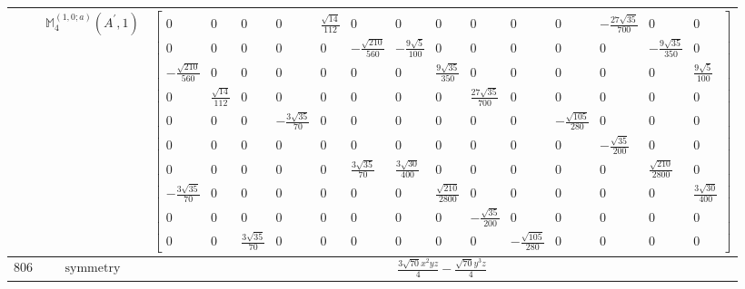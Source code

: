 \documentclass[fleqn,8pt,landscape]{jsarticle}
\begin{document}
\begin{longtable}{ccc}
$  $ & $ \mathbb{M}_{4}^{(1,0;a)}(A^{\prime},1) $ & $ \begin{bmatrix} 0 & 0 & 0 & 0 & \frac{\sqrt{14}}{112} & 0 & 0 & 0 & 0 & 0 & 0 & - \frac{27 \sqrt{35}}{700} & 0 & 0 \\ 0 & 0 & 0 & 0 & 0 & - \frac{\sqrt{210}}{560} & - \frac{9 \sqrt{5}}{100} & 0 & 0 & 0 & 0 & 0 & - \frac{9 \sqrt{35}}{350} & 0 \\ - \frac{\sqrt{210}}{560} & 0 & 0 & 0 & 0 & 0 & 0 & \frac{9 \sqrt{35}}{350} & 0 & 0 & 0 & 0 & 0 & \frac{9 \sqrt{5}}{100} \\ 0 & \frac{\sqrt{14}}{112} & 0 & 0 & 0 & 0 & 0 & 0 & \frac{27 \sqrt{35}}{700} & 0 & 0 & 0 & 0 & 0 \\ 0 & 0 & 0 & - \frac{3 \sqrt{35}}{70} & 0 & 0 & 0 & 0 & 0 & 0 & - \frac{\sqrt{105}}{280} & 0 & 0 & 0 \\ 0 & 0 & 0 & 0 & 0 & 0 & 0 & 0 & 0 & 0 & 0 & - \frac{\sqrt{35}}{200} & 0 & 0 \\ 0 & 0 & 0 & 0 & 0 & \frac{3 \sqrt{35}}{70} & \frac{3 \sqrt{30}}{400} & 0 & 0 & 0 & 0 & 0 & \frac{\sqrt{210}}{2800} & 0 \\ - \frac{3 \sqrt{35}}{70} & 0 & 0 & 0 & 0 & 0 & 0 & \frac{\sqrt{210}}{2800} & 0 & 0 & 0 & 0 & 0 & \frac{3 \sqrt{30}}{400} \\ 0 & 0 & 0 & 0 & 0 & 0 & 0 & 0 & - \frac{\sqrt{35}}{200} & 0 & 0 & 0 & 0 & 0 \\ 0 & 0 & \frac{3 \sqrt{35}}{70} & 0 & 0 & 0 & 0 & 0 & 0 & - \frac{\sqrt{105}}{280} & 0 & 0 & 0 & 0 \end{bmatrix} $ \\ \hline
$ 806 $ & $ \text{symmetry} $ & $ \frac{3 \sqrt{70} x^{2} y z}{4} - \frac{\sqrt{70} y^{3} z}{4} $ \\

\end{longtable}
\end{document}
